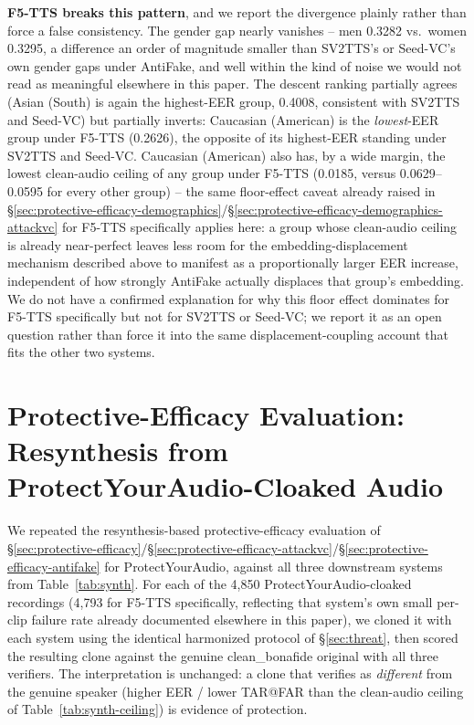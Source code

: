 \documentclass[11pt]{article}
\begin{document}
\textbf{F5-TTS breaks this pattern}, and we report the divergence
plainly rather than force a false consistency. The gender gap nearly
vanishes -- men 0.3282 vs.\ women 0.3295, a difference an order of
magnitude smaller than SV2TTS's or Seed-VC's own gender gaps under
AntiFake, and well within the kind of noise we would not read as
meaningful elsewhere in this paper. The descent ranking partially
agrees (Asian (South) is again the highest-EER group, 0.4008,
consistent with SV2TTS and Seed-VC) but partially inverts: Caucasian
(American) is the \emph{lowest}-EER group under F5-TTS (0.2626), the
opposite of its highest-EER standing under SV2TTS and Seed-VC.
Caucasian (American) also has, by a wide margin, the lowest clean-audio
ceiling of any group under F5-TTS (0.0185, versus 0.0629--0.0595 for
every other group) -- the same floor-effect caveat already raised in
\S\ref{sec:protective-efficacy-demographics}/\S\ref{sec:protective-efficacy-demographics-attackvc}
for F5-TTS specifically applies here: a group whose clean-audio ceiling
is already near-perfect leaves less room for the embedding-displacement
mechanism described above to manifest as a proportionally larger EER
increase, independent of how strongly AntiFake actually displaces that
group's embedding. We do not have a confirmed explanation for why this
floor effect dominates for F5-TTS specifically but not for SV2TTS or
Seed-VC; we report it as an open question rather than force it into the
same displacement-coupling account that fits the other two systems.

\section{Protective-Efficacy Evaluation: Resynthesis from ProtectYourAudio-Cloaked Audio}
\label{sec:protective-efficacy-protectyouraudio}

We repeated the resynthesis-based protective-efficacy evaluation of
\S\ref{sec:protective-efficacy}/\S\ref{sec:protective-efficacy-attackvc}/\S\ref{sec:protective-efficacy-antifake}
for ProtectYourAudio, against all three downstream systems from
Table~\ref{tab:synth}. For each of the 4,850 ProtectYourAudio-cloaked
recordings (4,793 for F5-TTS specifically, reflecting that system's own
small per-clip failure rate already documented elsewhere in this
paper), we cloned it with each system using the identical harmonized
protocol of \S\ref{sec:threat}, then scored the resulting clone
against the genuine clean\_bonafide original with all three verifiers.
The interpretation is unchanged: a clone that verifies as
\emph{different} from the genuine speaker (higher EER / lower
TAR@FAR than the clean-audio ceiling of Table~\ref{tab:synth-ceiling})
is evidence of protection.
\end{document}
